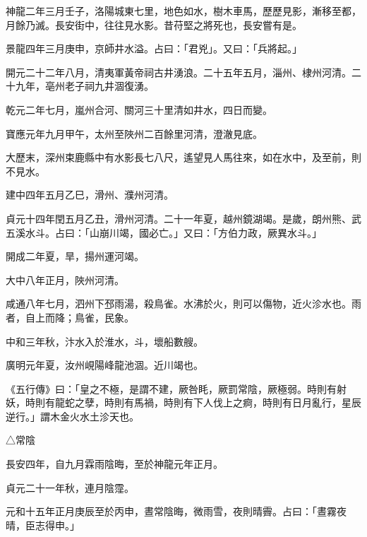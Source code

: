 \begin{pinyinscope}
 神龍二年三月壬子，洛陽城東七里，地色如水，樹木車馬，歷歷見影，漸移至都，月餘乃滅。長安街中，往往見水影。昔苻堅之將死也，長安嘗有是。



 景龍四年三月庚申，京師井水溢。占曰：「君兇」。又曰：「兵將起。」



 開元二十二年八月，清夷軍黃帝祠古井湧浪。二十五年五月，淄州、棣州河清。二十九年，亳州老子祠九井涸復湧。



 乾元二年七月，嵐州合河、關河三十里清如井水，四日而變。



 寶應元年九月甲午，太州至陜州二百餘里河清，澄澈見底。



 大歷末，深州束鹿縣中有水影長七八尺，遙望見人馬往來，如在水中，及至前，則不見水。



 建中四年五月乙巳，滑州、濮州河清。



 貞元十四年閏五月乙丑，滑州河清。二十一年夏，越州鏡湖竭。是歲，朗州熊、武五溪水斗。占曰：「山崩川竭，國必亡。」又曰：「方伯力政，厥異水斗。」



 開成二年夏，旱，揚州運河竭。



 大中八年正月，陜州河清。



 咸通八年七月，泗州下邳雨湯，殺鳥雀。水沸於火，則可以傷物，近火沴水也。雨者，自上而降；鳥雀，民象。



 中和三年秋，汴水入於淮水，斗，壞船數艘。



 廣明元年夏，汝州峴陽峰龍池涸。近川竭也。



 《五行傳》曰：「皇之不極，是謂不建，厥咎眊，厥罰常陰，厥極弱。時則有射妖，時則有龍蛇之孽，時則有馬禍，時則有下人伐上之痾，時則有日月亂行，星辰逆行。」謂木金火水土沴天也。



 △常陰



 長安四年，自九月霖雨陰晦，至於神龍元年正月。



 貞元二十一年秋，連月陰霪。



 元和十五年正月庚辰至於丙申，晝常陰晦，微雨雪，夜則晴霽。占曰：「晝霧夜晴，臣志得申。」




\end{pinyinscope}
